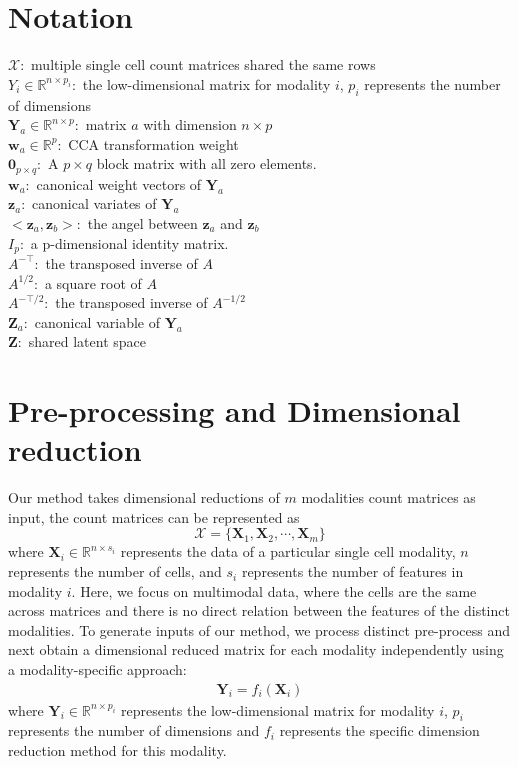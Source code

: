 \section{Notation}
\label{inte_methods:Notation}
$\mathcal{X}: $ multiple single cell count matrices shared the same rows\\
$Y_{i} \in \mathbb{R}^{n\times p_{i}}: $ the low-dimensional matrix for modality $i$, $p_{i}$ represents the number of dimensions \\
$\mathbf{Y}_a\in \mathbb{R}^{n\times p}: $ matrix $a$ with dimension $n\times p$ \\
${\mathbf w}_a\in\mathbb{R}^p: $ CCA transformation weight \\  
$\mathbf{0}_{p\times q}: $ A $p\times q$ block matrix with all zero elements.\\
${\mathbf w}_a: $ canonical weight vectors of $\mathbf{Y}_a$ \\
${\mathbf z}_a: $ canonical variates of $\mathbf{Y}_a$ \\
$<\mathbf{z}_a, \mathbf{z}_b>:$ the angel between $\mathbf{z}_a$ and $\mathbf{z}_b$ \\
$I_p:$ a p-dimensional identity matrix.\\
$A^{-\top}:$ the transposed inverse of $A$\\
$A^{1/2}:$ a square root of $A$\\
$A^{-\top/2}:$ the transposed inverse of $A^{-1/2}$\\
${\mathbf Z}_a :$ canonical variable of $\mathbf{Y}_a$ \\
${\mathbf Z}: $ shared latent space \\


\section{Pre-processing and Dimensional reduction}
\label{inte_methods:preprocessing}
Our method takes dimensional reductions of $m$ modalities count matrices as input, the count matrices can be represented as
\begin{equation}
    \mathcal{X}=\{\textbf{X}_1,\textbf{X}_2,\cdots,\textbf{X}_m\}
\end{equation}
where $\textbf{X}_{i} \in \mathbb{R}^{n\times s_{i}}$ represents the data of a particular single cell modality, $n$ represents the number of cells, and $s_{i}$ represents the number of features in modality $i$. Here, we focus on multimodal data, where the cells are the same across matrices and there is no direct relation between the features of the distinct modalities. To generate inputs of our method, we process distinct pre-process and next obtain a dimensional reduced matrix for each modality independently using a modality-specific approach:
\begin{align}
    \textbf{Y}_{i}=f_{i}(\textbf{X}_{i})
\end{align}
where $\textbf{Y}_{i} \in \mathbb{R}^{n\times p_{i}}$ represents the low-dimensional matrix for modality $i$, $p_{i}$ represents the number of dimensions and $f_{i}$ represents the specific dimension reduction method for this modality.

